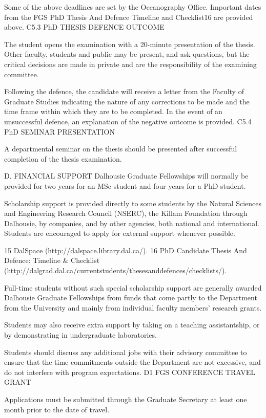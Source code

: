 Some of the above deadlines are set by the Oceanography Office. Important dates from the FGS PhD Thesis And Defence Timeline and Checklist16 are provided above.
C5.3	PhD THESIS DEFENCE OUTCOME

The student opens the examination with a 20-minute presentation of the thesis. Other faculty, students and public may be present, and ask questions, but the critical decisions are made in private and are the responsibility of the examining committee.

Following the defence, the candidate will receive a letter from the Faculty of Graduate Studies indicating the nature of any corrections to be made and the time frame within which they are to be completed.  In the event of an unsuccessful defence, an explanation of the negative outcome is provided.
C5.4	PhD SEMINAR PRESENTATION

A departmental seminar on the thesis should be presented after successful completion of the thesis examination.

D.	FINANCIAL  SUPPORT
Dalhousie Graduate Fellowships will normally be provided for two years for an MSc student and four years for a PhD student.

Scholarship support is provided directly to some students by the Natural Sciences and Engineering Research Council (NSERC), the Killam Foundation through Dalhousie, by companies, and by other agencies, both national and international. Students are encouraged to apply for external support whenever possible.


15 DalSpace (http://dalspace.library.dal.ca/).
16 PhD Candidate Thesis And Defence: Timeline & Checklist (http://dalgrad.dal.ca/currentstudents/thesesanddefences/checklists/).
 

Full-time students without such special scholarship support are generally awarded Dalhousie Graduate Fellowships from funds that come partly to the Department from the University and mainly from individual faculty members’ research grants.

Students may also receive extra support by taking on a teaching assistantship, or by demonstrating in undergraduate laboratories.

Students should discuss any additional jobs with their advisory committee to ensure that the time commitments outside the Department are not excessive, and do not interfere with program expectations.
D1	FGS CONFERENCE TRAVEL GRANT

Applications must be submitted through the Graduate Secretary at least one month prior to the date of travel.

